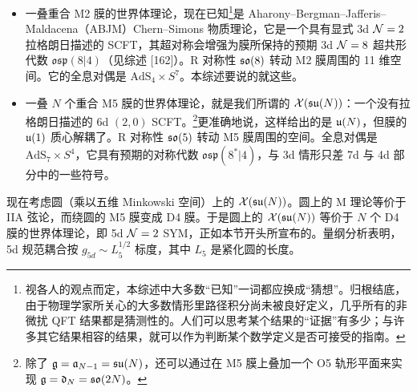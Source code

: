 \begin{itemize}[leftmargin=1.6em,itemsep=2pt,topsep=2pt]
\item 一叠重合 M2 膜的世界体理论，现在已知\footnote{视各人的观点而定，本综述中大多数“已知”一词都应换成“猜想”。归根结底，由于物理学家所关心的大多数情形里路径积分尚未被良好定义，几乎所有的非微扰 QFT 结果都是猜测性的。人们可以思考某个结果的“证据”有多少；与许多其它结果相容的结果，就可以作为判断某个数学定义是否可接受的指南。}是 Aharony--Bergman--Jafferis--Maldacena（ABJM）Chern--Simons 物质理论，它是一个具有显式 3d $\mathcal{N}=2$ 拉格朗日描述的 SCFT，其超对称会增强为膜所保持的预期 3d $\mathcal{N}=8$ 超共形代数 $\mathfrak{osp}(8|4)$（见综述 [162]）。R 对称性 $\mathfrak{so}(8)$ 转动 M2 膜周围的 11 维空间。它的全息对偶是 $\mathrm{AdS}_4\times S^7$。本综述要说的就这些。

\item 一叠 $N$ 个重合 M5 膜的世界体理论，就是我们所谓的 $\mathcal{X}(\mathfrak{su}(N))$：一个没有拉格朗日描述的 6d $(2,0)$ SCFT。\footnote{除了 $\mathfrak{g}=\mathfrak{a}_{N-1}=\mathfrak{su}(N)$，还可以通过在 M5 膜上叠加一个 O5 轨形平面来实现 $\mathfrak{g}=\mathfrak{d}_N=\mathfrak{so}(2N)$。}更准确地说，这样给出的是 $\mathfrak{u}(N)$，但膜的 $\mathfrak{u}(1)$ 质心解耦了。R 对称性 $\mathfrak{so}(5)$ 转动 M5 膜周围的空间。全息对偶是 $\mathrm{AdS}_7\times S^4$，它具有预期的对称代数 $\mathfrak{osp}(8^*|4)$，与 3d 情形只差 7d 与 4d 部分中的一些符号。
\end{itemize}


现在考虑圆（乘以五维 Minkowski 空间）上的 $\mathcal{X}(\mathfrak{su}(N))$。圆上的 M 理论等价于 IIA 弦论，而绕圆的 M5 膜变成 D4 膜。于是圆上的 $\mathcal{X}(\mathfrak{su}(N))$ 等价于 $N$ 个 D4 膜的世界体理论，即 5d $\mathcal{N}=2$ SYM，正如本节开头所宣布的。量纲分析表明，5d 规范耦合按 $g_{5d}\sim L_5^{1/2}$ 标度，其中 $L_5$ 是紧化圆的长度。


